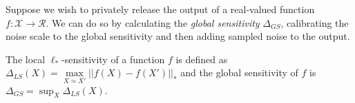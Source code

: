 Suppose we wish to privately release the output of a real-valued function $f: \mathcal{X} \rightarrow \mathcal{R}$. We can do so by calculating the \emph{global sensitivity} $\Delta_{GS}$, calibrating the noise scale to the global sensitivity and then adding sampled noise to the output.



\begin{definition}
The local $\ell_*$-sensitivity of a function $f$ is defined as $\Delta_{LS}(X) = \max\limits_{X \simeq X'} || f(X) - f(X') ||_* $ and the global sensitivity of $f$ is $\Delta_{GS} = \sup_X \Delta_{LS}(X)$.
\end{definition}

